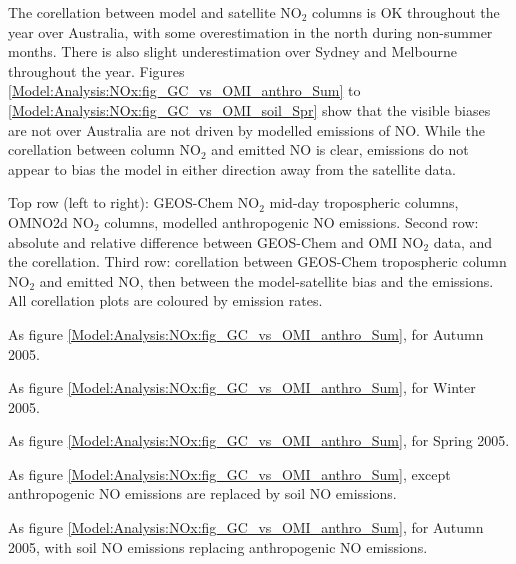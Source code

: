     The corellation between model and satellite NO$_2$ columns is OK throughout the year over Australia, with some overestimation in the north during non-summer months.
    There is also slight underestimation over Sydney and Melbourne throughout the year.
    Figures \ref{Model:Analysis:NOx:fig_GC_vs_OMI_anthro_Sum} to \ref{Model:Analysis:NOx:fig_GC_vs_OMI_soil_Spr} show that the visible biases are not over Australia are not driven by modelled emissions of NO.
    While the corellation between column NO$_2$ and emitted NO is clear, emissions do not appear to bias the model in either direction away from the satellite data.
    
      {
        Top row (left to right): GEOS-Chem NO$_2$ mid-day tropospheric columns, OMNO2d NO$_2$ columns, modelled anthropogenic NO emissions. 
        Second row: absolute and relative difference between GEOS-Chem and OMI NO$_2$ data, and the corellation.
        Third row: corellation between GEOS-Chem tropospheric column NO$_2$ and emitted NO, then between the model-satellite bias and the emissions.
        All corellation plots are coloured by emission rates.
      }
      {\label{Model:Analysis:NOx:fig_GC_vs_OMI_anthro_Sum}}
    
      {As figure \ref{Model:Analysis:NOx:fig_GC_vs_OMI_anthro_Sum}, for Autumn 2005.}
      {\label{Model:Analysis:NOx:fig_GC_vs_OMI_anthro_Aut}}
      
      {As figure \ref{Model:Analysis:NOx:fig_GC_vs_OMI_anthro_Sum}, for Winter 2005.}
      {\label{Model:Analysis:NOx:fig_GC_vs_OMI_anthro_Win}}
    
      {As figure \ref{Model:Analysis:NOx:fig_GC_vs_OMI_anthro_Sum}, for Spring 2005.}
      {\label{Model:Analysis:NOx:fig_GC_vs_OMI_anthro_Spr}}
    
      {As figure \ref{Model:Analysis:NOx:fig_GC_vs_OMI_anthro_Sum}, except anthropogenic NO emissions are replaced by soil NO emissions.}
      {\label{Model:Analysis:NOx:fig_GC_vs_OMI_soil_Sum}}
    
      {As figure \ref{Model:Analysis:NOx:fig_GC_vs_OMI_anthro_Sum}, for Autumn 2005, with soil NO emissions replacing anthropogenic NO emissions.}
      {\label{Model:Analysis:NOx:fig_GC_vs_OMI_soil_Aut}}
      
